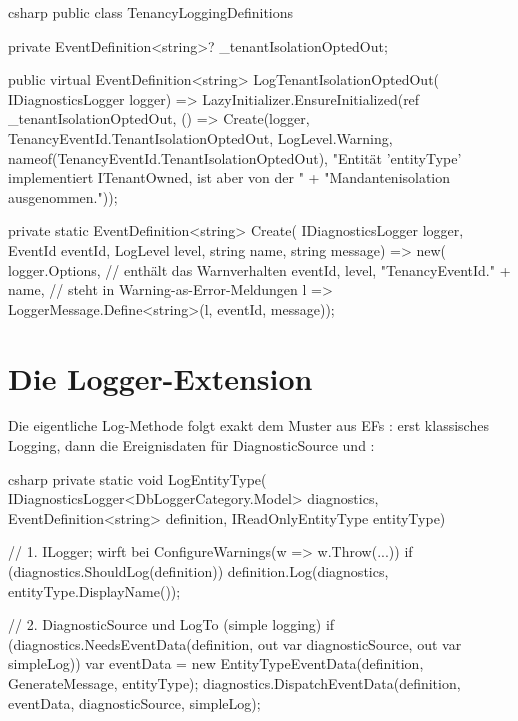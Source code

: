 \begin{sourcecode}{csharp}
public class TenancyLoggingDefinitions
{
    private EventDefinition<string>? _tenantIsolationOptedOut;

    public virtual EventDefinition<string> LogTenantIsolationOptedOut(
        IDiagnosticsLogger logger)
        => LazyInitializer.EnsureInitialized(ref _tenantIsolationOptedOut, () =>
            Create(logger, TenancyEventId.TenantIsolationOptedOut, LogLevel.Warning,
                nameof(TenancyEventId.TenantIsolationOptedOut),
                "Entität '{entityType}' implementiert ITenantOwned, ist aber von der "
                + "Mandantenisolation ausgenommen."));

    private static EventDefinition<string> Create(
        IDiagnosticsLogger logger, EventId eventId, LogLevel level,
        string name, string message)
        => new(
            logger.Options,                       // enthält das Warnverhalten
            eventId,
            level,
            "TenancyEventId." + name,             // steht in Warning-as-Error-Meldungen
            l => LoggerMessage.Define<string>(l, eventId, message));
}
\end{sourcecode}

\section{Die Logger-Extension}

Die eigentliche Log-Methode folgt exakt dem Muster aus EFs
: erst klassisches Logging, dann die
Ereignisdaten für DiagnosticSource und :

\begin{sourcecode}{csharp}
private static void LogEntityType(
    IDiagnosticsLogger<DbLoggerCategory.Model> diagnostics,
    EventDefinition<string> definition,
    IReadOnlyEntityType entityType)
{
    // 1. ILogger; wirft bei ConfigureWarnings(w => w.Throw(...))
    if (diagnostics.ShouldLog(definition))
        definition.Log(diagnostics, entityType.DisplayName());

    // 2. DiagnosticSource und LogTo (simple logging)
    if (diagnostics.NeedsEventData(definition, out var diagnosticSource, out var simpleLog))
    {
        var eventData = new EntityTypeEventData(definition, GenerateMessage, entityType);
        diagnostics.DispatchEventData(definition, eventData, diagnosticSource, simpleLog);
    }
}
\end{sourcecode}

